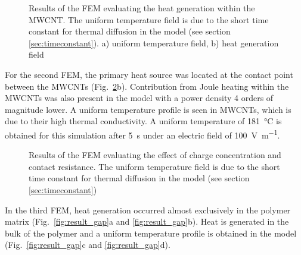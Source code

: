 \begin{figure}[h!]
	\centering
	 \qquad
	\caption{Results of the FEM evaluating the heat generation within the MWCNT. The uniform temperature field is due to the short time constant for thermal diffusion in the model (see section \ref{sec:timeconstant}). a) uniform temperature field, b) heat generation field \cite{Brassard2018_figshare_article1}}
	\label{fig:results_axysymmetric}
\end{figure}

For the second FEM, the primary heat source was located at the contact point between the MWCNTs (Fig.~\ref{fig:results_3D}b). 
Contribution from Joule heating within the MWCNTs was also present in the model with a power density 4 orders of magnitude lower. 
A uniform temperature profile is seen in MWCNTs, which is due to their high thermal conductivity. 
A uniform temperature of \SI{181}{\celsius} is obtained for this simulation after \SI{5}{\second} under an electric field of \SI{100}{\volt\per\metre}. 

\begin{figure}[h!]
	\centering
	 \qquad
	\caption{Results of the FEM evaluating the effect of charge concentration and contact resistance. The uniform temperature field is due to the short time constant for thermal diffusion in the model (see section \ref{sec:timeconstant}) \cite{Brassard2018_figshare_article1}}
	\label{fig:results_3D}
\end{figure}
\FloatBarrier

In the third FEM, heat generation occurred almost exclusively in the polymer matrix (Fig.~\ref{fig:result_gap}a and \ref{fig:result_gap}b). 
Heat is generated in the bulk of the polymer and a uniform temperature profile is obtained in the model (Fig.~\ref{fig:result_gap}c and \ref{fig:result_gap}d). 

